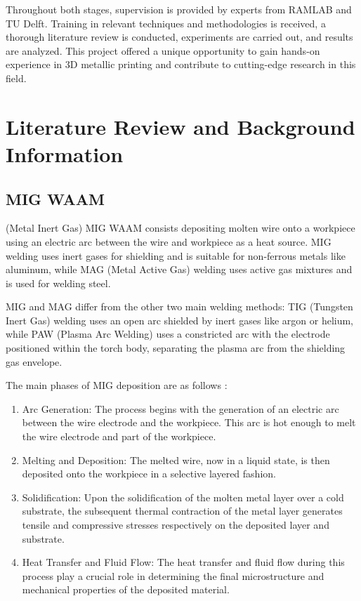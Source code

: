 Throughout both stages, supervision is provided by experts from RAMLAB and TU Delft. Training in relevant techniques and methodologies is received, a thorough literature review is conducted, experiments are carried out, and results are analyzed. This project offered a unique opportunity to gain hands-on experience in 3D metallic printing and contribute to cutting-edge research in this field.

\section{Literature Review and Background Information}

\subsection{MIG WAAM}

(Metal Inert Gas) MIG WAAM consists depositing molten wire onto a workpiece using an electric arc between the wire and workpiece as a heat source. MIG welding uses inert gases for shielding and is suitable for non-ferrous metals like aluminum, while MAG (Metal Active Gas) welding uses active gas mixtures and is used for welding steel.

MIG and MAG differ from the other two main welding methods: TIG (Tungsten Inert Gas) welding uses an open arc shielded by inert gases like argon or helium, while PAW (Plasma Arc Welding) uses a constricted arc with the electrode positioned within the torch body, separating the plasma arc from the shielding gas envelope.

The main phases of MIG deposition are as follows \cite{Stinson_Ward_Quinn_McGarrigle_2021}:

\begin{enumerate}
    \item Arc Generation: The process begins with the generation of an electric arc between the wire electrode and the workpiece. This arc is hot enough to melt the wire electrode and part of the workpiece.
    \item Melting and Deposition: The melted wire, now in a liquid state, is then deposited onto the workpiece in a selective layered fashion.
    \item Solidification: Upon the solidification of the molten metal layer over a cold substrate, the subsequent thermal contraction of the metal layer generates tensile and compressive stresses respectively on the deposited layer and substrate.
    \item Heat Transfer and Fluid Flow: The heat transfer and fluid flow during this process play a crucial role in determining the final microstructure and mechanical properties of the deposited material. \cite{Srivastava_Garg_Sharma_Sachdeva_2021}
\end{enumerate}

